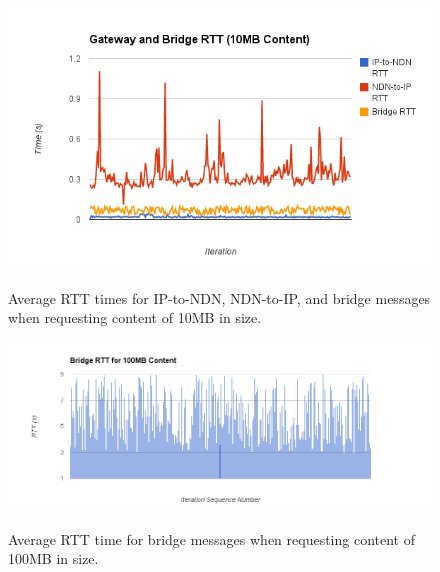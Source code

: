 \begin{figure}
\begin{center}
\includegraphics[scale=0.7]{./images/large.png}
\label{fig:perf2}
\caption{Average RTT times for IP-to-NDN, NDN-to-IP, and bridge messages when requesting content of 10MB in size.}
\end{center}
\end{figure}

\begin{figure}
\begin{center}
\includegraphics[scale=0.5]{./images/huge.png}
\label{fig:perf3}
\caption{Average RTT time for bridge messages when requesting content of 100MB in size.}
\end{center}
\end{figure}


